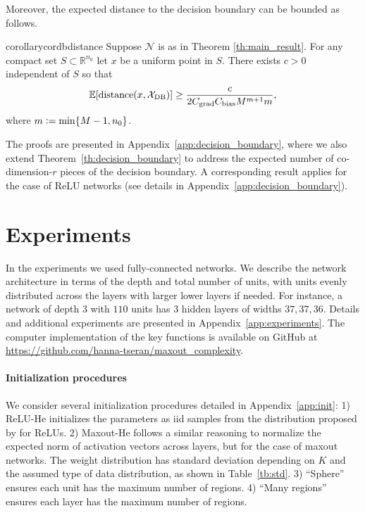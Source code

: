 \documentclass{article}
\theoremstyle{definition}
\newcommand{\cbias}{C_{\text{\normalfont bias}}}
\newcommand{\cgrad}{C_{\text{\normalfont grad}}}
\newcommand{\defeq}{\vcentcolon=}
\newcommand{\net}{\mathcal{N}}
\newcommand{\nin}{n_0}
\begin{document}
Moreover, the expected distance to the decision boundary can be bounded as follows. 

\begin{restatable}{corollary}{cordbdistance}
    \label{cor:dist_to_db}
    Suppose $\net$ is as in Theorem \ref{th:main_result}. For any compact set $S \subset \mathbb{R}^{\nin}$ let $x$ be a uniform point in $S$.
    There exists $c > 0$ independent of $S$ so that
    \begin{align*}
        \mathbb{E} [\text{\normalfont distance}(x, \mathcal{X}_{\operatorname{DB}} )] \geq
        \frac{c}{2 \cgrad \cbias M^{m + 1} m},
    \end{align*}
    where $m \defeq \min\{M - 1, \nin \}$.
\end{restatable}

The proofs are presented in Appendix~\ref{app:decision_boundary}, where we also extend Theorem~\ref{th:decision_boundary} to address the expected number of co-dimension-$r$ pieces of the decision boundary. 
A corresponding result applies for the case of ReLU networks (see details in Appendix~\ref{app:decision_boundary}). 

\section{Experiments}
\label{section:experiments}

In the experiments we used fully-connected networks. We describe the network architecture in terms of the depth and total number of units, with units evenly distributed across the layers with larger lower layers if needed. 
For instance, a network of depth $3$ with $110$ units has 3 hidden layers of widths $37, 37, 36$. 
Details and additional experiments are presented in Appendix~\ref{app:experiments}. 
The computer implementation of the key functions is available on GitHub at \url{https://github.com/hanna-tseran/maxout_complexity}. 

\paragraph{Initialization procedures} 
We consider several initialization procedures detailed in Appendix~\ref{app:init}: 
1) ReLU-He initializes the parameters as iid samples from the distribution proposed by \cite{he2015delving} for ReLUs. 
2) Maxout-He follows a similar reasoning to normalize the expected norm of activation vectors across layers, but for the case of maxout networks. The weight distribution has standard deviation depending on $K$ and the assumed type of data distribution, as shown in Table~\ref{tb:std}. 
3) ``Sphere'' ensures each unit has the maximum number of regions. 
4) ``Many regions'' ensures each layer has the maximum number of regions. 
\end{document}
